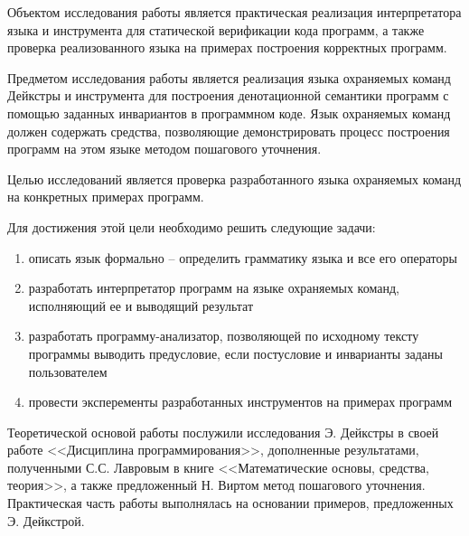 Объектом исследования работы является практическая реализация интерпретатора языка и
инструмента для статической верификации кода программ, а также проверка реализованного языка на примерах построения корректных программ. 

Предметом исследования работы является реализация языка охраняемых команд Дейкстры и инструмента для построения
денотационной семантики программ с помощью заданных инвариантов в программном коде. Язык охраняемых команд 
должен содержать средства, позволяющие демонстрировать процесс построения программ на этом языке методом пошагового уточнения.


Целью исследований является проверка разработанного языка охраняемых команд на конкретных примерах программ.

Для достижения этой цели необходимо решить следующие задачи:
\begin{enumerate}
	\item описать язык формально -- определить грамматику языка и все его операторы
	\item разработать интерпретатор программ на языке охраняемых команд, исполняющий ее и выводящий результат
	\item разработать программу-анализатор, позволяющей по исходному тексту программы выводить предусловие, если постусловие и инварианты заданы пользователем
	\item провести эксперементы разработанных инструментов на примерах программ
\end{enumerate} 


Теоретической основой работы послужили исследования Э. Дейкстры 
в своей работе <<Дисциплина программирования>>\cite{Dijkstra}, дополненные результатами, полученными С.С. Лавровым в книге <<Математические основы, средства, теория>>\cite{Lavrov},
а также предложенный Н. Виртом\cite{Wirth} метод пошагового уточнения.
Практическая часть работы выполнялась на основании примеров, предложенных Э. Дейкстрой.